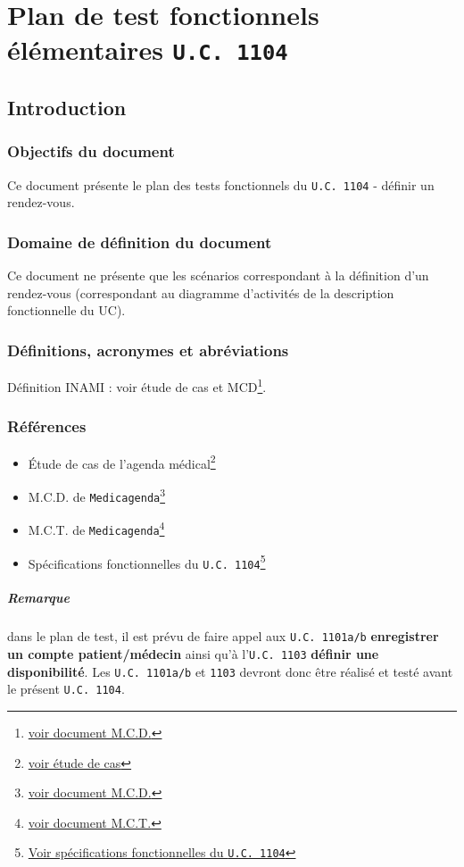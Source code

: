 \chapter{Plan de test fonctionnels élémentaires \texttt{U.C. 1104}}
\section{Introduction}
\subsection{Objectifs du document}
Ce document présente  le plan des tests fonctionnels du \texttt{U.C. 1104} -
définir un rendez-vous. 
\subsection{Domaine de définition du document}
Ce document ne présente que les scénarios correspondant à la définition d’un
rendez-vous (correspondant au diagramme d’activités de la description fonctionnelle
du UC).
\subsection{Définitions, acronymes et abréviations}
Définition INAMI : voir étude de cas et MCD\footnote{\href{../MCD/MCD.pdf}{voir document M.C.D.}}.
\subsection{Références}
\begin{itemize}
	\item[] Étude de cas de l'agenda
		médical\footnote{\href{../Enonce_Travail_Synthese_14-15.pdf}{voir
		étude de cas}}
	\item[] M.C.D. de \texttt{Medicagenda}\footnote{\href{../MCD/MCD.pdf}{voir document M.C.D.}}
	\item[] M.C.T. de \texttt{Medicagenda}\footnote{\href{./MCT.pdf}{voir document M.C.T.}}
	\item[] Spécifications fonctionnelles du \texttt{U.C.
		1104}\footnote{\href{./specifications_fonctionnelles_UC_1104_definir_un_rendez-vous.pdf}{Voir
			spécifications fonctionnelles du \texttt{U.C. 1104}}}
	\end{itemize}

	\paragraph{Remarque}
	dans le plan de test, il est prévu de faire appel aux \texttt{U.C. 1101a/b} 
	\textbf{enregistrer un compte patient/médecin} ainsi qu'à l'\texttt{U.C. 1103}
	\textbf{définir une disponibilité}.
	Les \texttt{U.C. 1101a/b} et \texttt{1103} devront
	donc être réalisé et testé avant le présent \texttt{U.C. 1104}.

